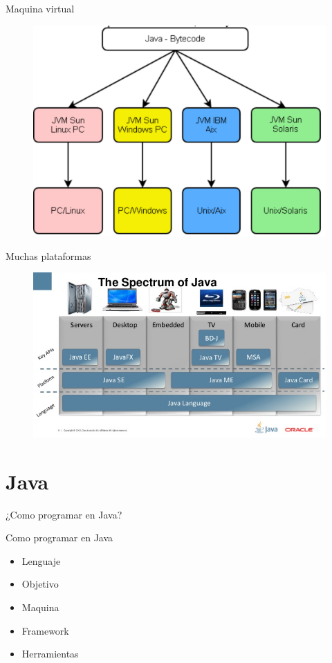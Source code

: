 \documentclass{beamer}
\begin{document}
\begin{frame}{Maquina virtual}
	\begin{figure}
		\centering
		\includegraphics[width=0.9\linewidth]{Images/jvm}
	\end{figure}
\end{frame}

\begin{frame}{Muchas plataformas}
	\begin{figure}
		\centering
		\includegraphics[width=0.9\linewidth]{Images/spectrum}
	\end{figure}
\end{frame}

\section{Java}
\begin{frame}
	\huge ¿Como programar en Java?
\end{frame}

\begin{frame}{Como programar en Java}
	\begin{itemize}
		\item Lenguaje
		\item Objetivo
		\item Maquina
		\item Framework
		\item Herramientas
	\end{itemize}
\end{frame}
\end{document}
